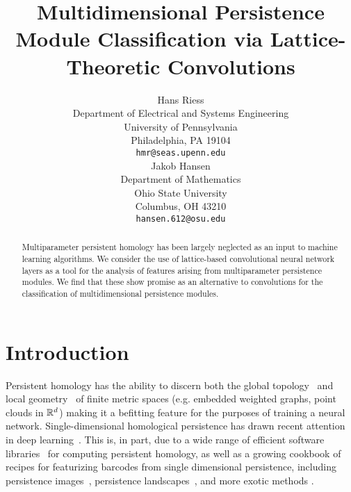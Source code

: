 \documentclass{article}
\title{Multidimensional Persistence Module Classification via Lattice-Theoretic Convolutions}
\author{%
  Hans Riess  \\
  Department of Electrical and Systems Engineering \\
  University of Pennsylvania\\
  Philadelphia, PA 19104 \\
  \texttt{hmr@seas.upenn.edu} \\
  \And
  Jakob Hansen \\
  Department of Mathematics \\
  Ohio State University \\
  Columbus, OH 43210 \\
  \texttt{hansen.612@osu.edu}
}
\begin{document}
\maketitle

\begin{abstract}
 Multiparameter persistent homology has been largely neglected as an input to
 machine learning algorithms.
 We consider the use of lattice-based convolutional neural network layers as a 
 tool for the analysis of features arising from multiparameter persistence
 modules. We find that these show promise as an alternative to convolutions for
 the classification of multidimensional persistence modules.
\end{abstract}

\section{Introduction}

Persistent homology has the ability to discern both the global
topology~\cite{ghrist_barcodes:_2008} and local
geometry~\cite{bubenik_persistent_2020} of finite metric spaces (e.g. embedded
weighted graphs, point clouds in $\mathbb{R}^d$) making it a befitting feature for the
purposes of training a neural network. Single-dimensional homological
persistence has drawn recent attention in deep learning~\cite{hofer_deep_2017,
pun_persistent-homology-based_2018, bruel-gabrielsson_topology_2020}. This is,
in part, due to a wide range of efficient software
libraries~\cite{otter_roadmap_2017, henselman_matroid_2017, bauer_ripser:_2019}
for computing persistent homology, %
as well as a growing cookbook of recipes 
for featurizing barcodes from single dimensional persistence, including
persistence images~\cite{adams_persistence_2017}, persistence
landscapes~\cite{bubenik_statistical_2015}, and more exotic methods
\cite{kalisnik_tropical_2019}.
\end{document}

